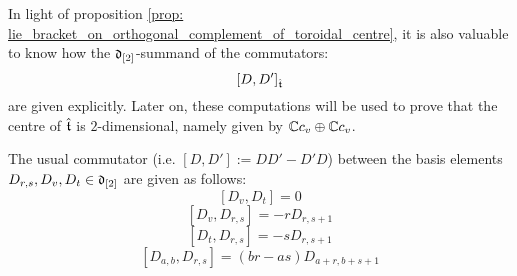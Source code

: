         In light of proposition \ref{prop: lie_bracket_on_orthogonal_complement_of_toroidal_centre}, it is also valuable to know how the $\mathfrak{d}_{[2]}$-summand of the commutators:
            $$[D, D']_{\hat{\mathfrak{t}}}$$
        are given explicitly. Later on, these computations will be used to prove that the centre of $\hat{\mathfrak{t}}$ is $2$-dimensional, namely given by $\mathbb{C} c_v \oplus \mathbb{C} c_v$.
        \begin{lemma} \label{lemma: explicit_commutators_between_basis_elements_of_toroidal_central_orthogonal_complement}
            The usual commutator (i.e. $[D, D'] := DD' - D'D$) between the basis elements $D_{r, s}, D_v, D_t \in \mathfrak{d}_{[2]}$ are given as follows:
                $$[D_v, D_t] = 0$$
                $$[D_v, D_{r, s}] = -r D_{r, s + 1}$$
                $$[D_t, D_{r, s}] = -s D_{r, s + 1}$$
                $$[D_{a, b}, D_{r, s}] = (br - as) D_{a + r, b + s + 1}$$
        \end{lemma}
